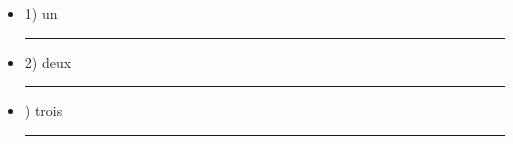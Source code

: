 \documentclass{article}
\begin{document}
\begin{itemize}
\item 1) un \rule{2\textwidth}{3pt} 
\item 2) deux \rule{2\textwidth}{3pt}
\item {}) trois \rule{2\textwidth}{3pt}
\end{itemize}


\end{document}
